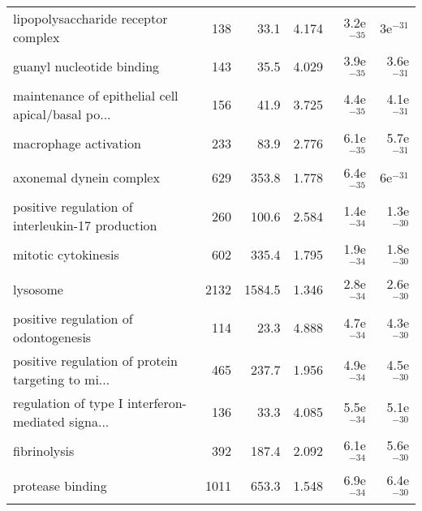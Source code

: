 \begin{longtable}{lrrrrr}
               lipopolysaccharide receptor complex &                     138 &                    33.1 &      4.174 &         3.2e$^{-35}$ &           3e$^{-31}$ \\
                         guanyl nucleotide binding &                     143 &                    35.5 &      4.029 &         3.9e$^{-35}$ &         3.6e$^{-31}$ \\
 maintenance of epithelial cell apical/basal po... &                     156 &                    41.9 &      3.725 &         4.4e$^{-35}$ &         4.1e$^{-31}$ \\
                             macrophage activation &                     233 &                    83.9 &      2.776 &         6.1e$^{-35}$ &         5.7e$^{-31}$ \\
                           axonemal dynein complex &                     629 &                   353.8 &      1.778 &         6.4e$^{-35}$ &           6e$^{-31}$ \\
  positive regulation of interleukin-17 production &                     260 &                   100.6 &      2.584 &         1.4e$^{-34}$ &         1.3e$^{-30}$ \\
                               mitotic cytokinesis &                     602 &                   335.4 &      1.795 &         1.9e$^{-34}$ &         1.8e$^{-30}$ \\
                                          lysosome &                    2132 &                  1584.5 &      1.346 &         2.8e$^{-34}$ &         2.6e$^{-30}$ \\
              positive regulation of odontogenesis &                     114 &                    23.3 &      4.888 &         4.7e$^{-34}$ &         4.3e$^{-30}$ \\
 positive regulation of protein targeting to mi... &                     465 &                   237.7 &      1.956 &         4.9e$^{-34}$ &         4.5e$^{-30}$ \\
 regulation of type I interferon-mediated signa... &                     136 &                    33.3 &      4.085 &         5.5e$^{-34}$ &         5.1e$^{-30}$ \\
                                      fibrinolysis &                     392 &                   187.4 &      2.092 &         6.1e$^{-34}$ &         5.6e$^{-30}$ \\
                                  protease binding &                    1011 &                   653.3 &      1.548 &         6.9e$^{-34}$ &         6.4e$^{-30}$ \\

\end{longtable}
